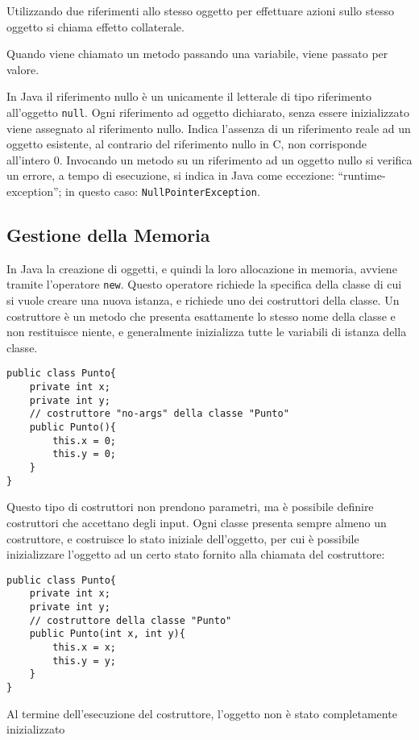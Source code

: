 \documentclass{article}
\numberwithin{equation}{subsection}
\begin{document}
Utilizzando due riferimenti allo stesso oggetto per effettuare azioni sullo stesso oggetto si chiama effetto collaterale. 

Quando viene chiamato un metodo passando una variabile, viene passato per valore. 

In Java il riferimento nullo è un unicamente il letterale di tipo riferimento all'oggetto \verb|null|. Ogni riferimento ad oggetto dichiarato, senza essere inizializzato 
viene assegnato al riferimento nullo. Indica l'assenza di un riferimento reale ad un oggetto esistente, al contrario del riferimento nullo in C, non corrisponde all'intero $0$. 
Invocando un metodo su un riferimento ad un oggetto nullo si verifica un errore, a tempo di esecuzione, si indica in Java come eccezione: ``runtime-exception''; in questo caso: 
\verb|NullPointerException|. 


\subsection{Gestione della Memoria}

In Java la creazione di oggetti, e quindi la loro allocazione in memoria, avviene tramite l'operatore \verb|new|. Questo operatore richiede la specifica della classe di cui si 
vuole creare una nuova istanza, e richiede uno dei costruttori della classe. 
Un costruttore è un metodo che presenta esattamente lo stesso nome della classe e non restituisce niente, e generalmente inizializza tutte le variabili di istanza della classe. 

\begin{verbatim}
public class Punto{
    private int x;
    private int y;
    // costruttore "no-args" della classe "Punto"
    public Punto(){
        this.x = 0;
        this.y = 0;
    }
}
\end{verbatim}
Questo tipo di costruttori non prendono parametri, ma è possibile definire costruttori che accettano degli input. Ogni classe presenta sempre almeno un costruttore, e 
costruisce lo stato iniziale dell'oggetto, per cui è possibile inizializzare l'oggetto ad un certo stato fornito alla chiamata del costruttore:
\begin{verbatim}
public class Punto{
    private int x;
    private int y;
    // costruttore della classe "Punto"
    public Punto(int x, int y){
        this.x = x;
        this.y = y;
    }
}
\end{verbatim}

Al termine dell'esecuzione del costruttore, l'oggetto non è stato completamente inizializzato %
\end{document}
